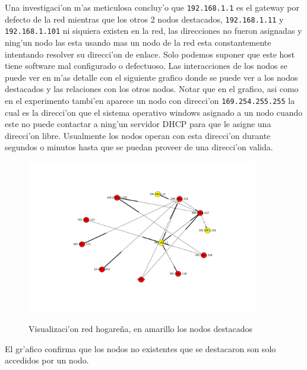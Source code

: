 Una investigaci'on m'as meticulosa concluy'o que \texttt{192.168.1.1} es el gateway por defecto de la red mientras que los otros 2 nodos
destacados, \texttt{192.168.1.11} y \texttt{192.168.1.101} ni siquiera existen en la red, las direcciones no fueron asignadas y ning'un
nodo las esta usando mas un nodo de la red esta constantemente intentando resolver su direcci'on de enlace. Solo podemos
suponer que este host tiene software mal configurado o defectuoso.
Las interacciones de los nodos se puede ver en m'as detalle con el siguiente grafico donde se puede ver a los nodos destacados
y las relaciones con los otros nodos. Notar que en el grafico, asi como en el experimento tambi'en aparece un nodo con direcci'on 
\texttt{169.254.255.255} la cual es la direcci'on que el sistema operativo windows asignado a un nodo cuando este no puede
contactar a ning'un servidor DHCP para que le asigne una direcci'on libre. Usualmente los nodos operan con esta direcci'on durante
segundos o minutos hasta que se puedan proveer de una direcci'on valida.

\begin{figure}[!h]
\centering
\caption{Visualizaci'on red hogare\~na, en amarillo los nodos destacados}
\includegraphics[width=0.9\textwidth]{red1_red}
 \label{fig:red1net}
\end{figure}

El gr'afico confirma que los nodos no existentes que se destacaron son solo accedidos por un nodo.\\
